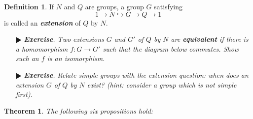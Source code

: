 \documentclass[11pt]{amsart}
\newtheorem*{theorem*}{Theorem}
\theoremstyle{definition}
\newtheorem*{definition*}{Definition}
\renewcommand\:{\colon}
\newcommand{\1}{\mathds{1}}
\newcommand{\exc}[1]{\vspace{-2.5pt}\begin{itemize}[leftmargin=15pt]\item[$\RHD$] \textit{\textbf{Exercise}. #1}\end{itemize}}
\begin{document}
\begin{definition*}
	If $N$ and $Q$ are groups, a group $G$ satisfying 
		\[ 1 \to N \hookrightarrow G \to Q \to 1 \]
	is called an \textbf{\textit{extension}} of $Q$ by $N$.
\end{definition*}

\exc{Two extensions $G$ and $G'$ of $Q$ by $N$ are \textbf{\textit{equivalent}} if there is a homomorphism $f\: G \to G'$ such that the diagram below commutes. Show such an $f$ is an isomorphism.}
\vskip-15pt
\begin{center}
\end{center}

\exc{Relate simple groups with the extension question: when does an extension $G$ of $Q$ by $N$ exist? \textnormal{(}hint: consider a group which is not simple first\textnormal{)}.}

\begin{theorem*}
	The following six propositions hold:
\end{theorem*}
\end{document}
